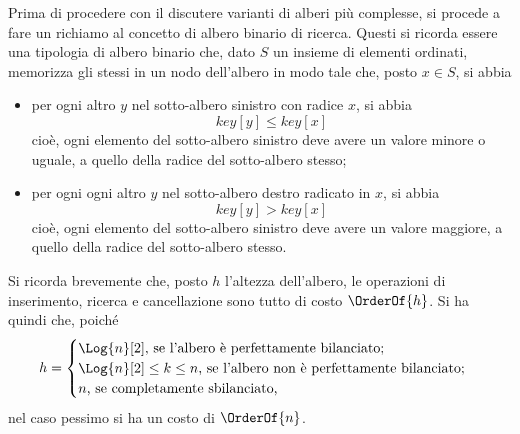 \documentclass{subfiles}
\begin{document}
Prima di procedere con il discutere varianti di alberi più complesse, si procede a fare un richiamo al concetto di albero binario di ricerca.
Questi si ricorda essere una tipologia di albero binario che, dato \(S\) un insieme di elementi ordinati,
memorizza gli stessi in un nodo dell'albero in modo tale che, posto \(x \in S\), si abbia
\begin{itemize}
    \item per ogni altro \(y\) nel sotto-albero sinistro con radice \(x\), si abbia
          \[
              key[y] \le key[x]
          \]
          cioè, ogni elemento del sotto-albero sinistro deve avere un valore minore o uguale, a quello della radice del sotto-albero stesso;
    \item per ogni ogni altro \(y\) nel sotto-albero destro radicato in \(x\), si abbia
          \[
              key[y] > key[x]
          \]
          cioè, ogni elemento del sotto-albero sinistro deve avere un valore maggiore, a quello della radice del sotto-albero stesso.
\end{itemize}
Si ricorda brevemente che, posto \(h\) l'altezza dell'albero, le operazioni di inserimento, ricerca e cancellazione sono tutto di costo \(\OrderOf{h}\).
Si ha quindi che, poiché
\[h = \begin{cases}
        \Log{n}[2] \text{, se l'albero è perfettamente bilanciato;}                 \\
        \Log{n}[2] \le k \le n \text{, se l'albero non è perfettamente bilanciato;} \\
        n \text{, se completamente sbilanciato,}
    \end{cases}\]
nel caso pessimo si ha un costo di \(\OrderOf{n}\).
\end{document}
